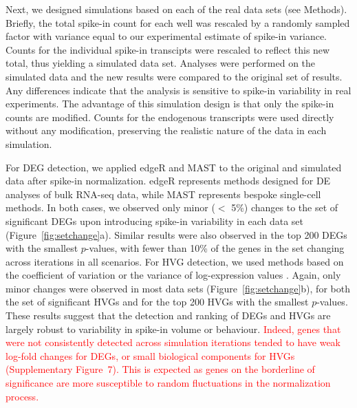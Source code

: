 \documentclass{article}
\newcommand{\suppfiglostsim}{7}
\newcommand{\revised}[1]{\textcolor{red}{#1}}
\begin{document}
Next, we designed simulations based on each of the real data sets (see Methods).
Briefly, the total spike-in count for each well was rescaled by a randomly sampled factor with variance equal to our experimental estimate of spike-in variance.
Counts for the individual spike-in transcipts were rescaled to reflect this new total, thus yielding a simulated data set.
Analyses were performed on the simulated data and the new results were compared to the original set of results.
Any differences indicate that the analysis is sensitive to spike-in variability in real experiments.
The advantage of this simulation design is that only the spike-in counts are modified.
Counts for the endogenous transcripts were used directly without any modification, preserving the realistic nature of the data in each simulation.

For DEG detection, we applied edgeR \citep{robinson2010edgeR} and MAST \citep{finak2015mast} to the original and simulated data after spike-in normalization.
edgeR represents methods designed for DE analyses of bulk RNA-seq data, while MAST represents bespoke single-cell methods.
In both cases, we observed only minor ($<$ 5\%) changes to the set of significant DEGs upon introducing spike-in variability in each data set (Figure~\ref{fig:setchange}a). 
Similar results were also observed in the top 200 DEGs with the smallest $p$-values, with fewer than 10\% of the genes in the set changing across iterations in all scenarios.
For HVG detection, we used methods based on the coefficient of variation \citep{brennecke2013accounting} or the variance of log-expression values \citep{lun2016stepbystep}.
Again, only minor changes were observed in most data sets (Figure~\ref{fig:setchange}b), for both the set of significant HVGs and for the top 200 HVGs with the smallest $p$-values.
These results suggest that the detection and ranking of DEGs and HVGs are largely robust to variability in spike-in volume or behaviour.
\revised{Indeed, genes that were not consistently detected across simulation iterations tended to have weak log-fold changes for DEGs, or small biological components for HVGs (Supplementary Figure~\suppfiglostsim{}).
This is expected as genes on the borderline of significance are more susceptible to random fluctuations in the normalization process.}
\end{document}
